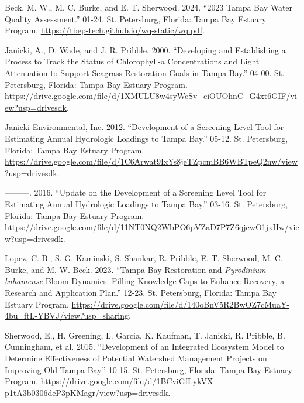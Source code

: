 \documentclass[
  letterpaper,
  DIV=11,
  numbers=noendperiod]{scrreport}
\newlength{\cslhangindent}
\newenvironment{CSLReferences}[2] %
 {\begin{list}{}{%
  \setlength{\itemindent}{0pt}
  \setlength{\leftmargin}{0pt}
  \setlength{\parsep}{0pt}
  \ifodd #1
   \setlength{\leftmargin}{\cslhangindent}
   \setlength{\itemindent}{-1\cslhangindent}
  \fi
  \setlength{\itemsep}{#2\baselineskip}}}
 {\end{list}}
\begin{document}

\label{refs}
\begin{CSLReferences}{1}{0}
Beck, M. W., M. C. Burke, and E. T. Sherwood. 2024. {``{2023 Tampa Bay
Water Quality Assessment}.''} 01-24. St. Petersburg, Florida: Tampa Bay
Estuary Program. \url{https://tbep-tech.github.io/wq-static/wq.pdf}.

Janicki, A., D. Wade, and J. R. Pribble. 2000. {``{Developing and
Establishing a Process to Track the Status of Chlorophyll-a
Concentrations and Light Attenuation to Support Seagrass Restoration
Goals in Tampa Bay}.''} 04-00. St. Petersburg, Florida: Tampa Bay
Estuary Program.
\url{https://drive.google.com/file/d/1XMULU8w4syWcSv_ciOUOhnC_G4xt6GIF/view?usp=drivesdk}.

Janicki Environmental, Inc. 2012. {``Development of a Screening Level
Tool for Estimating Annual Hydrologic Loadings to {T}ampa {B}ay.''}
05-12. St. Petersburg, Florida: Tampa Bay Estuary Program.
\url{https://drive.google.com/file/d/1C6Arwat9IxYs8jeTZpcmBB6WBTpeQ2nw/view?usp=drivesdk}.

---------. 2016. {``Update on the Development of a Screening Level Tool
for Estimating Annual Hydrologic Loadings to {T}ampa {B}ay.''} 03-16.
St. Petersburg, Florida: Tampa Bay Estuary Program.
\url{https://drive.google.com/file/d/11NT0NQ2WbPO6pVZaD7P7Z6qjcwO1jxHw/view?usp=drivesdk}.

Lopez, C. B., S. G. Kaminski, S. Shankar, R. Pribble, E. T. Sherwood, M.
C. Burke, and M. W. Beck. 2023. {``{T}ampa {B}ay Restoration and
\emph{{P}yrodinium {b}ahamense} Bloom Dynamics: Filling Knowledge Gaps
to Enhance Recovery, a Research and Application Plan.''} 12-23. St.
Petersburg, Florida: Tampa Bay Estuary Program.
\url{https://drive.google.com/file/d/140oBnV5R2BwOZ7cMuaY-4bu_ftL-YBVJ/view?usp=sharing}.

Sherwood, E., H. Greening, L. Garcia, K. Kaufman, T. Janicki, R.
Pribble, B. Cunningham, et al. 2015. {``Development of an {I}ntegrated
{E}cosystem {M}odel to Determine Effectiveness of Potential Watershed
Management Projects on Improving {O}ld {T}ampa {B}ay.''} 10-15. St.
Petersburg, Florida: Tampa Bay Estuary Program.
\url{https://drive.google.com/file/d/1BCviGfLykVX-p1tA3b0306deP3pKMagr/view?usp=drivesdk}.

\end{CSLReferences}
\end{document}

